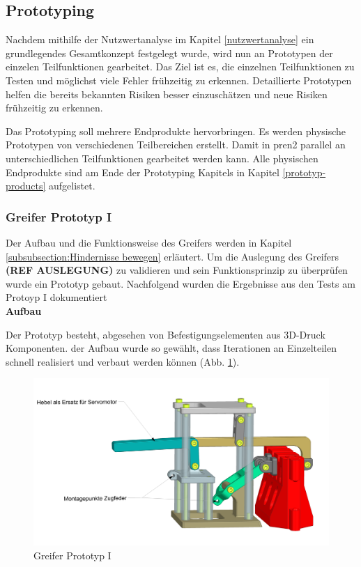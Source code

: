 \subsection{Prototyping}\label{prototyping}

Nachdem mithilfe der Nutzwertanalyse im Kapitel \ref{nutzwertanalyse} ein grundlegendes Gesamtkonzept festgelegt wurde, wird nun an Prototypen der einzelen Teilfunktionen gearbeitet. Das Ziel ist es, die einzelnen Teilfunktionen zu Testen und möglichst viele Fehler frühzeitig zu erkennen. Detaillierte Prototypen helfen die bereits bekannten Risiken besser einzuschätzen und neue Risiken frühzeitig zu erkennen.

Das Prototyping soll mehrere Endprodukte hervorbringen. Es werden physische Prototypen von verschiedenen Teilbereichen erstellt. Damit in \acrshort{pren2} parallel an unterschiedlichen Teilfunktionen gearbeitet werden kann. Alle physischen Endprodukte sind am Ende der Prototyping Kapitels in Kapitel \ref{prototyp-products} aufgelistet.

\subsubsection{Greifer Prototyp I}
\label{subsubsection:gripper-prototype-1}


Der Aufbau und die Funktionsweise des Greifers werden in Kapitel \ref{subsubsection:Hindernisse bewegen} erläutert. Um die Auslegung des Greifers \textbf{(REF AUSLEGUNG)} zu validieren und sein Funktionsprinzip zu überprüfen wurde ein Prototyp gebaut. Nachfolgend wurden die Ergebnisse aus den Tests am Protoyp I dokumentiert\\

\textbf{Aufbau}

 Der Prototyp besteht, abgesehen von Befestigungselementen aus 3D-Druck Komponenten. der Aufbau wurde so gewählt, dass Iterationen an Einzelteilen schnell realisiert und verbaut werden können (Abb. \ref{fig:gripper-prototype-1-trimetric-notes}). 

\begin{figure}[H]
\centering
\includegraphics[width=1.0\textwidth]{assets/greifer-prototyp/Greifer_Trimetrisch_Notes.png}
\caption{Greifer Prototyp I}
\label{fig:gripper-prototype-1-trimetric-notes}
\end{figure}

